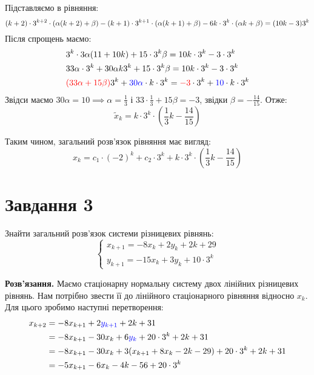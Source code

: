 \documentclass{hw_template}
\begin{document}
Підставляємо в рівняння:
\begin{equation*}
    (k+2) \cdot 3^{k+2} \cdot (\alpha(k+2)+\beta) - (k+1) \cdot 3^{k+1} \cdot (\alpha(k+1)+\beta) - 6k \cdot 3^k \cdot (\alpha k+\beta) = (10k-3)3^k \\
\end{equation*}
Після спрощень маємо:
\begin{align*}    
    &3^k \cdot 3\alpha(11+10k) + 15 \cdot 3^k \beta = 10k \cdot 3^k - 3 \cdot 3^k \\
    & 33\alpha \cdot 3^k + 30\alpha k 3^k + 15 \cdot 3^k \beta = 10k \cdot 3^k - 3 \cdot 3^k \\
    & \textcolor{red}{(33\alpha + 15\beta)}3^k + \textcolor{blue}{30\alpha} \cdot k \cdot 3^k = \textcolor{red}{-3} \cdot 3^k + \textcolor{blue}{10} \cdot k \cdot 3^k
\end{align*}
Звідси маємо $30\alpha = 10 \implies \alpha = \frac{1}{3}$ і $33 \cdot \frac{1}{3} + 15\beta = -3$, звідки $\beta = -\frac{14}{15}$. Отже:
\begin{equation*}
    \widetilde{x}_k = k \cdot 3^k \cdot \left(\frac{1}{3} k - \frac{14}{15}\right)
\end{equation*}

Таким чином, загальний розв'язок рівняння має вигляд:
\begin{equation*}
    \boxed{x_k = c_1 \cdot (-2)^k + c_2 \cdot 3^k + k \cdot 3^k \cdot \left(\frac{1}{3} k - \frac{14}{15}\right)}
\end{equation*}

\pagebreak

\section{Завдання 3}

\begin{problem}
    Знайти загальний розв'язок системи різницевих рівнянь:
    \begin{equation*}
        \begin{cases}
            x_{k+1} = -8x_k + 2y_k + 2k + 29 \\
            y_{k+1} = -15x_k + 3y_k + 10 \cdot 3^k
        \end{cases}
    \end{equation*}
\end{problem}

\textbf{Розв'язання.} Маємо стаціонарну нормальну систему двох лінійних
різницевих рівнянь. Нам потрібно звести її до лінійного стаціонарного рівняння
відносно $x_k$. Для цього зробимо наступні перетворення:
\begin{align*}
    x_{k+2} &= -8x_{k+1} + 2\textcolor{blue}{y_{k+1}} + 2k + 31 \\
    &= -8x_{k+1} - 30x_k + 6\textcolor{blue}{y_k} + 20 \cdot 3^k + 2k + 31 \\
    &= -8x_{k+1} - 30x_k + 3(x_{k+1}+8x_k - 2k - 29) + 20 \cdot 3^k + 2k + 31 \\
    &= -5x_{k+1} - 6x_k - 4k - 56 + 20 \cdot 3^k
\end{align*}
\end{document}
